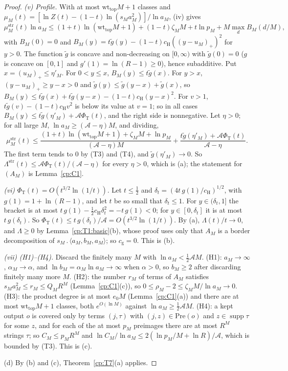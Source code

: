 \documentclass[11pt]{article}
\theoremstyle{definition}
\theoremstyle{remark}
\DeclareMathOperator{\supp}{supp}
\newcommand{\mat}[3]{\langle #1,#2,#3\rangle} %
\newcommand{\cp}{\mathbin{.}}                 %
\newcommand{\Lam}{\Lambda}                    %
\newcommand{\cg}{c_{\mathrm g}}               %
\newcommand{\Hcond}[1]{\textup{(H#1)}}        %
\newcommand{\Tcond}[1]{\textup{(T#1)}}        %
\newcommand{\Acs}{\mathcal A}                %
\newcommand{\wtop}{\mathrm{wt}_{\mathrm{top}}}
\newcommand{\Pre}{\mathrm{Pre}}              %
\newcommand{\PhiT}{\Phi_{\mathrm T}}         %
\newcommand{\cH}{c_{\mathrm H}}              %
\begin{document}
\begin{proof}
\emph{(v) Profile.} With at most $\wtop M+1$ classes and $\mu_M(t)=[\ln Z(t)-(1-t)\ln(s_Ma_M^2)]/\ln a_M$, (iv) gives
\[
\mu^{\mathrm{str}}_M(t)\ln a_M\le(1+t)\ln(\wtop M+1)+(1-t)\zeta_MM+t\ln p_M+M\max_dB_M(d/M),
\]
with $B_M(0)=0$ and $B_M(y)=t\tilde g(y)-(1-t)\cH((y-u_M)_+)^2$ for $y>0$. The function $\tilde g$ is concave and non-decreasing on $[0,\infty)$ with $\tilde g(0)=0$ ($g$ is concave on $[0,1]$ and $g'(1)=\ln(R-1)\ge0$), hence subadditive. Put $x=(u_M)_+\le\eta'_M$. For $0<y\le x$, $B_M(y)\le t\tilde g(x)$. For $y>x$, $(y-u_M)_+\ge y-x>0$ and $\tilde g(y)\le\tilde g(y-x)+\tilde g(x)$, so $B_M(y)\le t\tilde g(x)+t\tilde g(y-x)-(1-t)\cH(y-x)^2$. For $v>1$, $t\tilde g(v)-(1-t)\cH v^2$ is below its value at $v=1$; so in all cases $B_M(y)\le t\tilde g(\eta'_M)+\Acs\PhiT(t)$, and the right side is nonnegative. Let $\eta>0$; for all large $M$, $\ln a_M\ge(\Acs-\eta)M$, and dividing,
\[
\mu^{\mathrm{str}}_M(t)\le\frac{(1+t)\ln(\wtop M+1)+\zeta_MM+\ln p_M}{(\Acs-\eta)M}+\frac{t\tilde g(\eta'_M)+\Acs\PhiT(t)}{\Acs-\eta}.
\]
The first term tends to $0$ by \Tcond3{} and \Tcond4, and $\tilde g(\eta'_M)\to0$. So $\Lam^{\mathrm{str}}(t)\le\Acs\PhiT(t)/(\Acs-\eta)$ for every $\eta>0$, which is (a); the statement for $(A_M)$ is Lemma~\ref{cp:C1}.

\emph{(vi) $\PhiT(t)=O(t^{3/2}\ln(1/t))$.} Let $t\le\frac12$ and $\delta_t=(4t\,g(1)/\cH)^{1/2}$, with $g(1)=1+\ln(R-1)$, and let $t$ be so small that $\delta_t\le1$. For $y\in(\delta_t,1]$ the bracket is at most $t\,g(1)-\frac12\cH\delta_t^2=-t\,g(1)<0$; for $y\in[0,\delta_t]$ it is at most $t\,g(\delta_t)$. So $\PhiT(t)\le t\,g(\delta_t)/\Acs=O(t^{3/2}\ln(1/t))$. By (a), $\Lam(t)/t\to0$, and $\Lam\ge0$ by Lemma~\ref{cp:T1:basic}(b), whose proof uses only that $A_M$ is a border decomposition of $s_M\cp\mat{a_M}{b_M}{a_M}$; so $\cg=0$. This is (b).

\emph{(vii) \Hcond1--\Hcond4.} Discard the finitely many $M$ with $\ln a_M<\frac12\Acs M$. \Hcond1: $a_M\to\infty$, $\alpha_M\to\alpha$, and $\ln b_M=\alpha_M\ln a_M\to\infty$ when $\alpha>0$, so $b_M\ge2$ after discarding finitely many more $M$. \Hcond2: the number $r_M$ of terms of $A_M$ satisfies $s_Ma_M^2\le r_M\le Q_MR^M$ (Lemma~\ref{cp:C1}(c)), so $0\le\rho_M-2\le\zeta_MM/\ln a_M\to0$. \Hcond3: the product degree is at most $e_0M$ (Lemma~\ref{cp:C1}(a)) and there are at most $\wtop M+1$ classes, both $e^{O(\ln M)}$ against $\ln a_M\ge\frac12\Acs M$. \Hcond4: a kept output $o$ is covered only by terms $(j,\tau)$ with $(j,z)\in\Pre(o)$ and $z\in\supp\tau$ for some $z$, and for each of the at most $p_M$ preimages there are at most $R^M$ strings $\tau$; so $C_M\le p_MR^M$ and $\ln C_M/\ln a_M\le2(\ln p_M/M+\ln R)/\Acs$, which is bounded by \Tcond3. This is (c).

(d) By (b) and (c), Theorem~\ref{cp:T7}(a) applies.
\end{proof}
\end{document}
